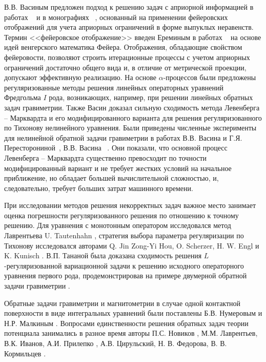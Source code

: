 {В.В. Васиным предложен подход к решению задач с априорной информацией в работах ~\cite{Vas1982, Vas1988} и в монографиях ~\cite{VasAge1993, VasEre2009}, основанный на применении фейеровских отображений для учета априорных ограничений в форме выпуклых неравенств. Термин <<фейеровское отображение>> введен Ереминым в работах ~\cite{Ere1965, Ere1966, Ere1968} на основе идей венгерского математика Фейера. Отображения, обладающие свойством фейеровости, позволяют строить итерационные процессы с учетом априорных ограничений достаточно общего вида и, в отличие от метрической проекции, допускают эффективную реализацию. На основе $\alpha$-процессов были предложены регуляризованные методы решения линейных операторных уравнений Фредгольма $I$ рода, возникающих, например, при решении линейных обратных задач гравиметрии. Также Васин доказал сильную сходимость метода Левенберга -- Марквардта и его модифицированного варианта для решения регуляризованного по Тихонову нелинейного уравнения. Были приведены численные эксперименты для нелинейной обратной задачи гравиметрии в работах В.В. Васина и Г.Я. Пересторониной~\cite{VasPer_2011}, В.В. Васина ~\cite{Vasin_2012}. Они показали, что основной процесс Левенберга -- Марквардта существенно превосходит по точности модифицированный вариант и не требует жестких условий на начальное приближение, но обладает большей вычислительной сложностью, и, следовательно, требует больших затрат машинного времени.

При исследовании методов решения некорректных задач важное место занимает оценка погрешности регуляризованного решения по отношению к точному решению. Для уравнения с монотонным оператором исследовался метод Лаврентьева U. Tautenhahn \cite{Tau2002,Tau2004}, стратегия выбора параметра регуляризации по Тихонову исследовался авторами Q. Jin Zong-Yi Hou, O. Scherzer, H. W. Engl и K. Kunisch \cite{JinZon1997,JinZon1999,SchEngKun1993}. В.П. Тананой была доказана сходимость решения $L$-регуляризованной вариационной задачи к решению исходного операторного уравнения первого рода, продемонстрировав на примере двумерной обратной задачи гравиметрии \cite{Tan2003_2}.

Обратные задачи гравиметрии и магнитометрии в случае одной контактной поверхности в виде интегральных уравнений были поставлены Б.В. Нумеровым и Н.Р. Малкиным \cite{Num1930, Mal1931}. Вопросами единственности решения обратных задач теории потенциала занимались в разное время авторы П.С. Новиков \cite{Nov1938}, М.М. Лаврентьев, В.К. Иванов, А.И. Прилепко \cite{Pri1965}, А.В. Цирульский, Н. В. Федорова, В. В. Кормильцев \cite{FedTsi1976,TsiKor1990}.

}
